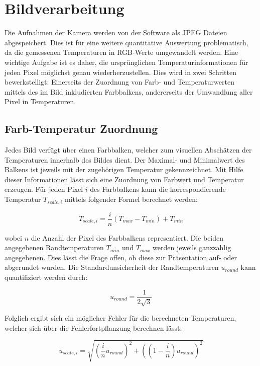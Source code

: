 \documentclass[10pt,a4paper,german]{article}
\begin{document}
\section{Bildverarbeitung}
Die Aufnahmen der Kamera werden von der Software als JPEG Dateien abgespeichert.
Dies ist für eine weitere quantitative Auswertung problematisch, da die gemessenen Temperaturen in RGB-Werte umgewandelt werden.
Eine wichtige Aufgabe ist es daher, die ursprünglichen Temperaturinformationen für jeden Pixel möglichst genau wiederherzustellen.
Dies wird in zwei Schritten bewerkstelligt:
Einerseits der Zuordnung von Farb- und Temperaturwerten mittels des im Bild inkludierten Farbbalkens, andererseits der Umwandlung aller Pixel in Temperaturen.

\subsection{Farb-Temperatur Zuordnung}
Jedes Bild verfügt über einen Farbbalken, welcher zum visuellen Abschätzen der Temperaturen innerhalb des Bildes dient.
Der Maximal- und Minimalwert des Balkens ist jeweils mit der zugehörigen Temperatur gekennzeichnet.
Mit Hilfe dieser Informationen lässt sich eine Zuordnung von Farbwert und Temperatur erzeugen.
Für jeden Pixel $i$ des Farbbalkens kann die korrespondierende Temperatur $T_{scale,i}$ mittels folgender Formel berechnet werden:

\begin{equation}
    T_{scale,i} = \frac{i}{n} \left(T_{max} - T_{min}\right) + T_{min}
\end{equation}

wobei $n$ die Anzahl der Pixel des Farbbalkens representiert.
Die beiden angegebenen Randtemperaturen $T_{min}$ und $T_{max}$ werden jeweils ganzzahlig angegebenen.
Dies lässt die Frage offen, ob diese zur Präsentation auf- oder abgerundet wurden.
Die Standardunsicherheit der Randtemperaturen $u_{round}$ kann quantifiziert werden durch:

\begin{equation}
    u_{round} = \frac{1}{2\sqrt{3}}
\end{equation}

Folglich ergibt sich ein möglicher Fehler für die berechneten Temperaturen, welcher sich über die Fehlerfortpflanzung berechnen lässt:

\begin{equation}
    u_{scale,i} = \sqrt{\left(\frac{i}{n} u_{round} \right)^2 + \left(\left(1 - \frac{i}{n}\right) u_{round}\right)^2}
\end{equation}
\end{document}
